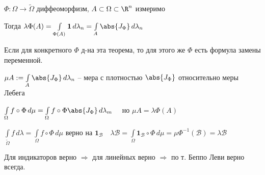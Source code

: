 
\begin{theorem}\thmslashn
	
	$\Phi: \Omega \to \tilde{\Omega}$ диффеоморфизм, $A \subset \Omega \subset \R^n$ измеримо
	
	Тогда $\lambda \Phi(A) = \int\limits_{\Phi(A)} \mathbf{1}\,d\lambda_n = \int\limits_{A} \abs{J_\Phi}\,d\lambda_n$
\end{theorem}

\begin{remark}\thmslashn

	Если для конкретного $\Phi$ д-на эта теорема, то для этого же $\Phi$ есть формула замены переменной.
	
	$\mu A := \int\limits_{A} \abs{J_\Phi} \,d\lambda_n$ -- мера с плотностью $\abs{J_\Phi}$ относительно меры Лебега 
	
	$\int\limits_\Omega f \circ \Phi \, d\mu = \int\limits_\Omega f \circ \Phi \abs{J_\Phi} \, d\lambda_m \quad$ но $\mu A = \lambda \Phi (A)$
	
	$\int\limits_{\tilde{\Omega}} f\,d\lambda = \int\limits_\Omega f \circ \Phi \, d\mu$  верно на $\mathbf{1}_\mathcal{B}\quad \lambda \mathcal{B} = \int\limits_\Omega \mathbf{1}_\mathcal{B} \circ \Phi \, d\mu = \mu \Phi^{-1}(\mathcal{B}) = \lambda \mathcal{B}$ 
	
	Для индикаторов верно $\Rightarrow$ для линейных верно $\Rightarrow$ по т. Беппо Леви верно всегда. 
	
\end{remark}

